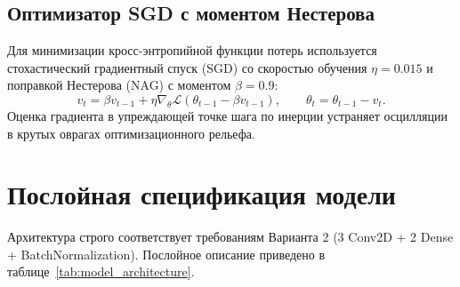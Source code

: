 \subsection{Оптимизатор SGD с моментом Нестерова}

Для минимизации кросс-энтропийной функции потерь используется стохастический градиентный спуск (SGD) со скоростью обучения $\eta = 0.015$ и поправкой Нестерова (NAG) с моментом $\beta = 0.9$:
\begin{equation}
    v_t = \beta v_{t-1} + \eta \nabla_\theta \mathcal{L}(\theta_{t-1} - \beta v_{t-1}), \qquad \theta_t = \theta_{t-1} - v_t.
    \label{eq:nesterov}
\end{equation}
Оценка градиента в упреждающей точке шага по инерции устраняет осцилляции в крутых оврагах оптимизационного рельефа.

\section{Послойная спецификация модели}

Архитектура строго соответствует требованиям Варианта 2 (3 Conv2D + 2 Dense + BatchNormalization). Послойное описание приведено в таблице~\ref{tab:model_architecture}.

